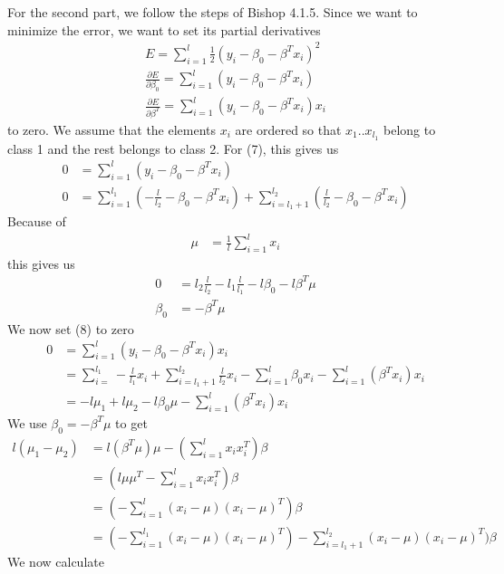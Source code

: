 \documentclass{article}
\begin{document}
For the second part, we follow the steps of Bishop 4.1.5. Since we want to minimize the error, we want to set its partial derivatives
\begin{eqnarray}
E=\sum\limits_{i=1}^l \frac{1}{2}(y_i - \beta_0 -\beta^Tx_i )^2 \\
\frac{\partial E}{\partial \beta_0}= \sum\limits_{i=1}^l (y_i - \beta_0 - \beta^Tx_i)\\
\frac{\partial E}{\partial \beta^T}= \sum\limits_{i=1}^l (y_i - \beta_0 - \beta^Tx_i)x_i
\end{eqnarray}
to zero. We assume that the elements $x_i$ are ordered so that $x_1..x_{l_1}$ belong to class 1 and the rest belongs to class 2. For (7), this gives us 
\begin{align*}
0&=\sum\limits_{i=1}^l(y_i-\beta_0-\beta^Tx_i) \\
0&=\sum\limits_{i=1}^{l_1} (-\frac{l}{l_2} -\beta_0-\beta^Tx_i) + \sum\limits_{i=l_1+1}^{l_2} (\frac{l}{l_2}-\beta_0-\beta^Tx_i) 
\end{align*}
Because of 
\begin{align*}
\mu&=\frac{1}{l} \sum\limits_{i=1}^{l}x_i
\end{align*}
this gives us
\begin{align*}
0&=l_2 \frac{l}{l_2}-l_1 \frac{l}{l_1}-l\beta_0-l\beta^T\mu \\
\beta_0 &= -\beta^T\mu
\end{align*}
We now set (8) to zero
\begin{align*}
0&=\sum\limits_{i=1}^{l} (y_i - \beta_0 -\beta^Tx_i)x_i \\
&=\sum\limits_{i=}^{l_1} - \frac{l}{l_1}x_i + \sum\limits_{i=l_1+1}^{l_2} \frac{l}{l_2}x_i - \sum\limits_{i=1}^l \beta_0x_i - \sum\limits_{i=1}^l (\beta^Tx_i)x_i \\
&=-l\mu_1 +l\mu_2 -l\beta_0\mu-\sum\limits_{i=1}^l(\beta^Tx_i)x_i
\end{align*}
We use $\beta_0=-\beta^T\mu$ to get
\begin{align*}
l(\mu_1-\mu_2) &= l(\beta^T\mu)\mu-(\sum\limits_{i=1}^l x_ix_i^T)\beta \\
&=(l\mu\mu^T-\sum\limits_{i=1}^l x_ix_i^T)\beta \\
&=(-\sum\limits_{i=1}^l (x_i-\mu)(x_i-\mu)^T)\beta \\
&=(-\sum\limits_{i=1}^{l_1}(x_i-\mu)(x_i-\mu)^T) - \sum\limits_{i=l_1+1}^{l_2}(x_i-\mu)(x_i-\mu)^T)\beta 
\end{align*}
We now calculate 
\end{document}
